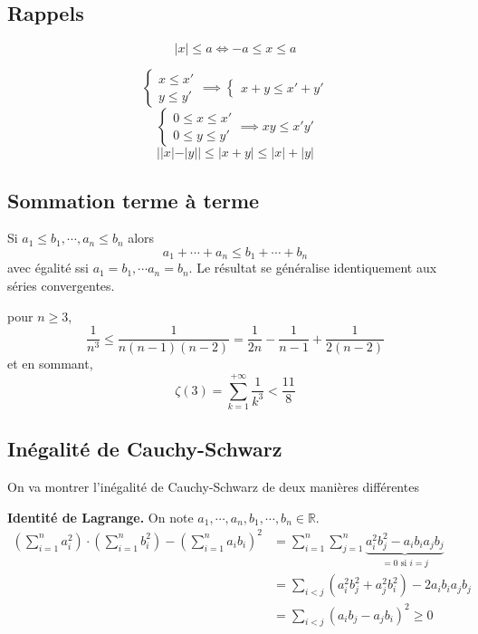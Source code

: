 \subsection{Rappels}

\[
    |x|\leq a\iff -a\leq x\leq a
\]

\[
    \begin{cases}
        x\leq x'\\ y\leq y'
    \end{cases}
    \implies \begin{cases}
        x+y\leq x'+y'
    \end{cases}
\]
\[
    \begin{cases}
        0\leq x\leq x'\\ 0\leq y\leq y'
    \end{cases}
    \implies xy\leq x'y'
\]
\[
    ||x|-|y||\leq |x+y|\leq |x|+|y|
\]

\subsection{Sommation terme à terme}

Si $a_1\leq b_1, \cdots, a_n\leq b_n$ alors \[
    a_1+\cdots +a_n\leq b_1+\cdots+ b_n
\]
avec égalité ssi $a_1=b_1,\cdots a_n=b_n$. Le résultat se généralise identiquement aux séries convergentes.

\begin{ex}
    pour $n\geq 3$, \[
        \frac1{n^3}\leq \frac1{n(n-1)(n-2)}=\frac1{2n}-\frac1{n-1}+\frac1{2(n-2)}
    \]
    et en sommant, \[
        \zeta(3)=\sum_{k=1}^{+\infty}\frac1{k^3}< \frac{11}8
    \]
\end{ex}

\subsection{Inégalité de Cauchy-Schwarz}


On va montrer l'inégalité de Cauchy-Schwarz de deux manières différentes


\textbf{Identité de Lagrange.} On note $a_1, \cdots, a_n, b_1, \cdots, b_n\in\mathbb R$. \begin{align*}
        \left( \sum_{i=1}^na_i^2 \right) \cdot \left( \sum_{i=1}^n b_i^2 \right)- \left( \sum_{i=1}^na_ib_i \right)^2 &= \sum_{i=1}^n\sum_{j=1}^n \underbrace{a_i^2b_j^2-a_ib_ia_jb_j}_{=0\text{ si }i=j} \\
                                                                                                                      &= \sum_{i<j}(a_i^2b_j^2+a_j^2b_i^2)-2a_ib_ia_jb_j \\ 
                                                                                                                      &= \sum_{i<j}(a_ib_j-a_jb_i)^2\geq 0
    \end{align*}

